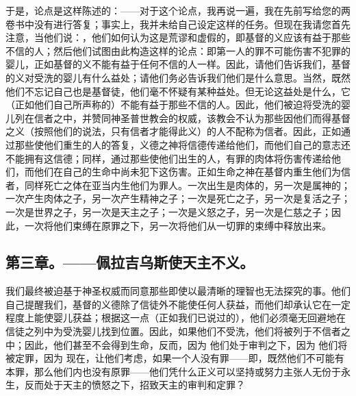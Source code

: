 于是，论点是这样陈述的：——对于这个论点，我再说一遍，我在先前写给您的两卷书中没有进行答复；事实上，我并未给自己设定这样的任务。但现在我请您首先注意，当他们说：，他们如何认为这是荒谬和虚假的，即基督的义应该有益于那些不信的人；然后他们试图由此构造这样的论点：即第一人的罪不可能伤害不犯罪的婴儿，正如基督的义不能有益于任何不信的人一样。因此，请他们告诉我们，基督的义对受洗的婴儿有什么益处；请他们务必告诉我们他们是什么意思。当然，既然他们不忘记自己也是基督徒，他们毫不怀疑有某种益处。但无论这益处是什么，它（正如他们自己所声称的）不能有益于那些不信的人。因此，他们被迫将受洗的婴儿列在信者之中，并赞同神圣普世教会的权威，该教会不认为那些因他们而得基督之义（按照他们的说法，只有信者才能得此义）的人不配称为信者。因此，正如通过那些使他们重生的人的答复，义德之神将信德传递给他们，而他们自己的意志还不能拥有这信德；同样，通过那些使他们出生的人，有罪的肉体将伤害传递给他们，而他们在自己的生命中尚未犯下这伤害。正如生命之神在基督内重生他们为信者，同样死亡之体在亚当内生他们为罪人。一次出生是肉体的，另一次是属神的；一次产生肉体之子，另一次产生精神之子；一次是死亡之子，另一次是复活之子；一次是世界之子，另一次是天主之子；一次是义怒之子，另一次是仁慈之子；因此，一次将他们束缚在原罪之下，另一次将他们从一切罪的束缚中释放出来。\par


\subsection{第三章。——佩拉吉乌斯使天主不义。}

我们最终被迫基于神圣权威而同意那些即使以最清晰的理智也无法探究的事。他们自己提醒我们，基督的义德除了信徒外不能使任何人获益，而他们却承认它在一定程度上能使婴儿获益；根据这一点（正如我们已说过的），他们必须毫无回避地在信徒之列中为受洗婴儿找到位置。因此，如果他们不受洗，他们将被列于不信者之中；因此，他们甚至不会得到生命，反而，因为 他们处于审判之下，因为 他们将被定罪，因为 现在，让他们考虑，如果一个人没有罪——即，既然他们不可能有本罪，那么他们内也没有原罪——他们凭什么正义可以坚持或努力主张人无份于永生，反而处于天主的愤怒之下，招致天主的审判和定罪？\par

